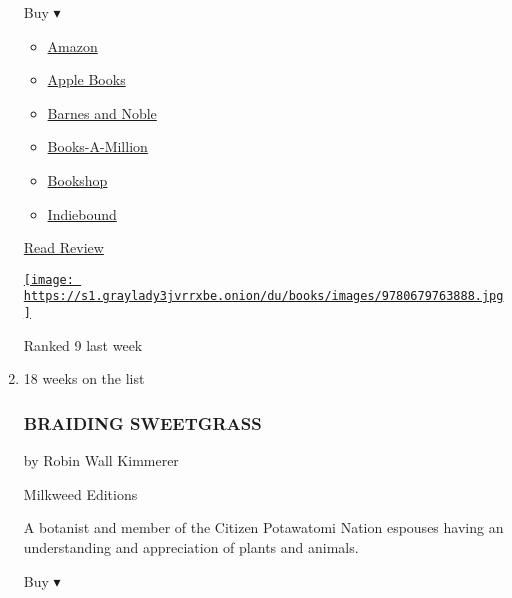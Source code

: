 \begin{enumerate}
  Buy ▾

  \begin{itemize}
  \tightlist
  \item
    \href{http://www.amazon.com/The-Warmth-Other-Suns-Migration-ebook/dp/B003EY7JGM?tag=NYTBS-20}{Amazon}
  \item
    \href{https://du-gae-books-dot-nyt-du-prd.appspot.com/buy?title=THE+WARMTH+OF+OTHER+SUNS\&author=Isabel+Wilkerson}{Apple
    Books}
  \item
    \href{https://www.anrdoezrs.net/click-7990613-11819508?url=https\%3A\%2F\%2Fwww.barnesandnoble.com\%2Fw\%2F\%3Fean\%3D9780679763888}{Barnes
    and Noble}
  \item
    \href{https://www.anrdoezrs.net/click-7990613-35140?url=https\%3A\%2F\%2Fwww.booksamillion.com\%2Fp\%2FTHE\%2BWARMTH\%2BOF\%2BOTHER\%2BSUNS\%2FIsabel\%2BWilkerson\%2F9780679763888}{Books-A-Million}
  \item
    \href{https://bookshop.org/a/3546/9780679763888}{Bookshop}
  \item
    \href{https://www.indiebound.org/book/9780679763888?aff=NYT}{Indiebound}
  \end{itemize}

  \href{https://www.nytimes3xbfgragh.onion/2010/08/31/books/31book.html}{Read
  Review}

  \href{https://www.nytimes3xbfgragh.onion/2010/08/31/books/31book.html}{\texttt{[image: https://s1.graylady3jvrrxbe.onion/du/books/images/9780679763888.jpg]}}

  Ranked 9 last week
\item
  18 weeks on the list

  \hypertarget{braiding-sweetgrass}{%
  \subsubsection{BRAIDING SWEETGRASS}\label{braiding-sweetgrass}}

  by Robin Wall Kimmerer

  Milkweed Editions

  A botanist and member of the Citizen Potawatomi Nation espouses having
  an understanding and appreciation of plants and animals.

  Buy ▾


\end{enumerate}
